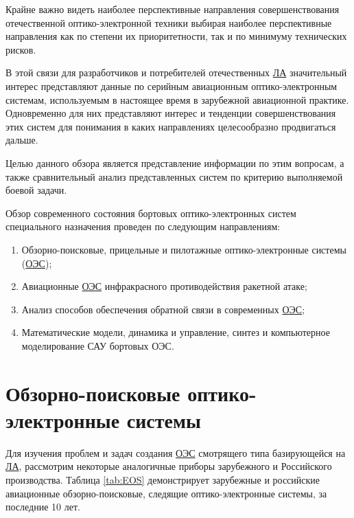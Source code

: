 Крайне важно видеть наиболее перспективные направления совершенствования отечественной оптико-электронной техники выбирая наиболее перспективные направления как по степени их приоритетности, так и по минимуму технических рисков. 

В этой связи для разработчиков и потребителей отечественных  \hyperref[acroLA]{ЛА} значительный интерес представляют данные по серийным авиационным оптико-электронным системам, используемым в настоящее время в зарубежной авиационной практике. Одновременно для них представляют интерес и тенденции совершенствования этих систем для понимания в каких направлениях целесообразно продвигаться дальше. 

Целью данного обзора является представление информации по этим вопросам, а также сравнительный анализ представленных систем по критерию выполняемой боевой задачи. 

Обзор современного состояния бортовых оптико-электронных систем специального назначения проведен по следующим направлениям:
\begin{enumerate}
	\item Обзорно-поисковые, прицельные и пилотажные оптико-электронные системы (\hyperref[acroEOS]{ОЭС});
	\item Авиационные \hyperref[acroEOS]{ОЭС} инфракрасного противодействия ракетной атаке;
	\item Анализ способов обеспечения обратной связи в современных  \hyperref[acroEOS]{ОЭС};
	\item Математические модели, динамика и управление, синтез и компьютерное моделирование САУ бортовых ОЭС.
\end{enumerate}

\section{Обзорно-поисковые оптико-электронные системы} \label{sec:ch1/sec1-}

Для изучения проблем и задач создания  \hyperref[acroEOS]{ОЭС} смотрящего типа базирующейся на  \hyperref[acroLA]{ЛА}, рассмотрим некоторые аналогичные приборы зарубежного и Российского производства. Таблица \ref{tab:EOS} демонстрирует зарубежные и российские авиационные обзорно-поисковые, следящие оптико-электронные системы, за последние 10 лет. 

